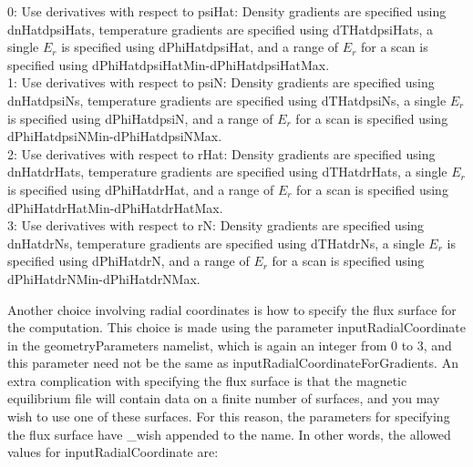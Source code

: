 {\setlength{\parindent}{0cm}

0: Use derivatives with respect to {\ttfamily psiHat}: Density gradients are specified using {\ttfamily dnHatdpsiHats}, 
temperature gradients are specified using {\ttfamily dTHatdpsiHats},  a single $E_r$ is specified using
{\ttfamily dPhiHatdpsiHat}, and a range of $E_r$ for a scan is specified using {\ttfamily dPhiHatdpsiHatMin}-{\ttfamily dPhiHatdpsiHatMax}.
\\

1: Use derivatives with respect to {\ttfamily psiN}: Density gradients are specified using {\ttfamily dnHatdpsiNs}, 
temperature gradients are specified using {\ttfamily dTHatdpsiNs},  a single $E_r$ is specified using
{\ttfamily dPhiHatdpsiN}, and a range of $E_r$ for a scan is specified using {\ttfamily dPhiHatdpsiNMin}-{\ttfamily dPhiHatdpsiNMax}.
\\

2: Use derivatives with respect to {\ttfamily rHat}: Density gradients are specified using {\ttfamily dnHatdrHats}, 
temperature gradients are specified using {\ttfamily dTHatdrHats},  a single $E_r$ is specified using
{\ttfamily dPhiHatdrHat}, and a range of $E_r$ for a scan is specified using {\ttfamily dPhiHatdrHatMin}-{\ttfamily dPhiHatdrHatMax}.
\\

3: Use derivatives with respect to {\ttfamily rN}: Density gradients are specified using {\ttfamily dnHatdrNs}, 
temperature gradients are specified using {\ttfamily dTHatdrNs},  a single $E_r$ is specified using
{\ttfamily dPhiHatdrN}, and a range of $E_r$ for a scan is specified using {\ttfamily dPhiHatdrNMin}-{\ttfamily dPhiHatdrNMax}.
\\

}

Another choice involving radial coordinates is how to specify the flux surface for the computation.
This choice is made using the parameter {\ttfamily inputRadialCoordinate} in the {\ttfamily geometryParameters}
namelist, which is again an integer from 0 to 3, and this parameter need not be the same as {\ttfamily inputRadialCoordinateForGradients}.
An extra complication with specifying the flux surface is that the magnetic equilibrium file will contain data on a finite number of surfaces,
and you may wish to use one of these surfaces.  For this reason, the parameters for specifying the flux surface have {\ttfamily \_wish}
appended to the name. In other words, the allowed values for {\ttfamily inputRadialCoordinate} are:\\

